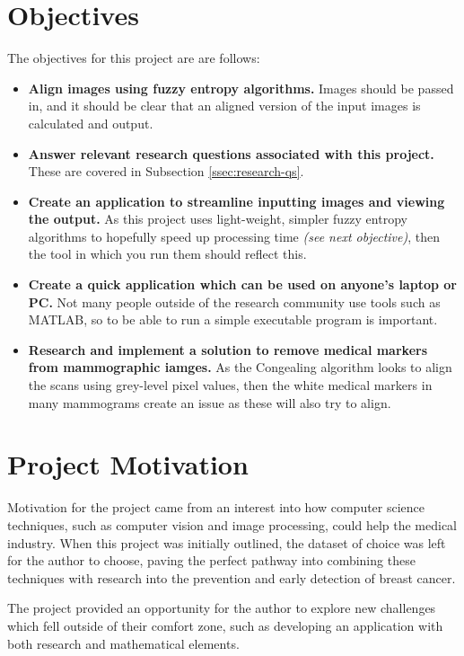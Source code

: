 \section{Objectives}
\label{sec:objectives}

The objectives for this project are are follows:

\begin{itemize}
  \item \textbf{Align images using fuzzy entropy algorithms.} Images should be passed in, and it should be clear that an aligned version of the input images is calculated and output.
  \item \textbf{Answer relevant research questions associated with this project.} These are covered in Subsection \ref{ssec:research-qs}.
  \item \textbf{Create an application to streamline inputting images and viewing the output.} As this project uses light-weight, simpler fuzzy entropy algorithms to hopefully speed up processing time \textit{(see next objective)}, then the tool in which you run them should reflect this.
  \item \textbf{Create a quick application which can be used on anyone's laptop or PC.} Not many people outside of the research community use tools such as MATLAB, so to be able to run a simple executable program is important.
  \item \textbf{Research and implement a solution to remove medical markers from mammographic iamges.} As the \Gls{Congealing} algorithm looks to align the scans using grey-level pixel values, then the white medical markers in many mammograms create an issue as these will also try to align.
\end{itemize}

\section{Project Motivation}

Motivation for the project came from an interest into how computer science techniques, such as computer vision and image processing, could help the medical industry. When this project was initially outlined, the dataset of choice was left for the author to choose, paving the perfect pathway into combining these techniques with research into the prevention and early detection of breast cancer.

The project provided an opportunity for the author to explore new challenges which fell outside of their comfort zone, such as developing an application with both research and mathematical elements.

